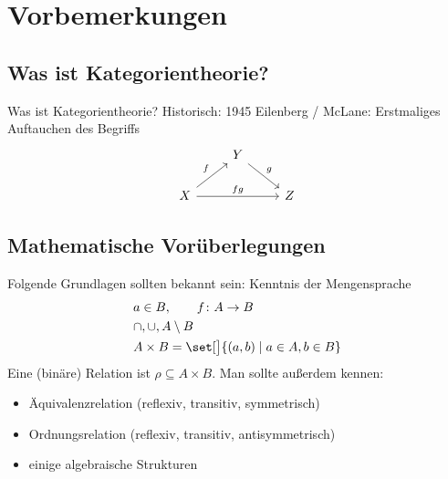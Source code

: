 
\chapter{Vorbemerkungen}
\section{Was ist Kategorientheorie?}
Was ist Kategorientheorie?\nl
Historisch:
1945 Eilenberg / McLane: Erstmaliges Auftauchen des Begriffs
$$\begin{tikzcd}
                                   & Y \arrow[rd, "g"] &   \\
X \arrow[ru, "f"] \arrow[rr, "fg"] &                   & Z
			\end{tikzcd}
$$

\section{Mathematische Vorüberlegungen}
Folgende Grundlagen sollten bekannt sein:
Kenntnis der Mengensprache
\begin{align*}
	&a\in B,\qquad f\colon A\to B\\
	&\cap,\cup,A\setminus B\\
	&A\times B=\set[\big]{(a,b)\mid a\in A,b\in B}
\end{align*}
Eine (binäre) Relation ist $\rho\subseteq A\times B$.
Man sollte außerdem kennen:
\begin{itemize}
	\item Äquivalenzrelation (reflexiv, transitiv, symmetrisch)
	\item Ordnungsrelation (reflexiv, transitiv, antisymmetrisch)
	\item einige algebraische Strukturen
\end{itemize}

